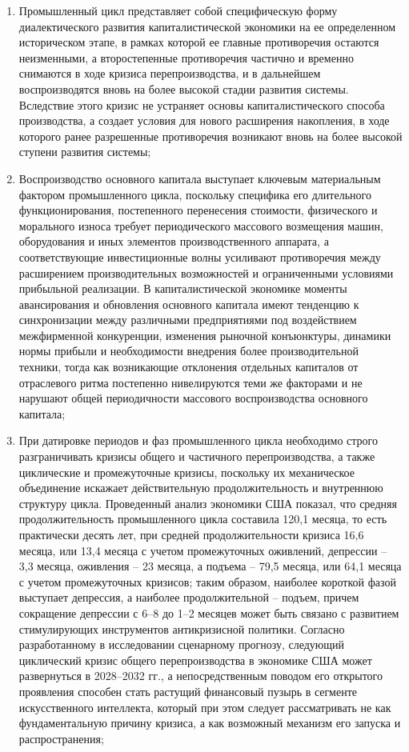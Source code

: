 \begin{enumerate}
    \item Промышленный цикл представляет собой специфическую форму диалектического развития капиталистической экономики на ее определенном историческом этапе, в рамках которой ее главные противоречия остаются неизменными, а второстепенные противоречия частично и временно снимаются в ходе кризиса перепроизводства, и в дальнейшем воспроизводятся вновь на более высокой стадии развития системы. Вследствие этого кризис не устраняет основы капиталистического способа производства, а создает условия для нового расширения накопления, в ходе которого ранее разрешенные противоречия возникают вновь на более высокой ступени развития системы;
    \item Воспроизводство основного капитала выступает ключевым материальным фактором промышленного цикла, поскольку специфика его длительного функционирования, постепенного перенесения стоимости, физического и морального износа требует периодического массового возмещения машин, оборудования и иных элементов производственного аппарата, а соответствующие инвестиционные волны усиливают противоречия между расширением производительных возможностей и ограниченными условиями прибыльной реализации. В капиталистической экономике моменты авансирования и обновления основного капитала имеют тенденцию к синхронизации между различными предприятиями под воздействием межфирменной конкуренции, изменения рыночной конъюнктуры, динамики нормы прибыли и необходимости внедрения более производительной техники, тогда как возникающие отклонения отдельных капиталов от отраслевого ритма постепенно нивелируются теми же факторами и не нарушают общей периодичности массового воспроизводства основного капитала;
    \item При датировке периодов и фаз промышленного цикла необходимо строго разграничивать кризисы общего и частичного перепроизводства, а также циклические и промежуточные кризисы, поскольку их механическое объединение искажает действительную продолжительность и внутреннюю структуру цикла. Проведенный анализ экономики США показал, что средняя продолжительность промышленного цикла составила 120,1 месяца, то есть практически десять лет, при средней продолжительности кризиса 16,6 месяца, или 13,4 месяца с учетом промежуточных оживлений, депрессии – 3,3 месяца, оживления – 23 месяца, а подъема – 79,5 месяца, или 64,1 месяца с учетом промежуточных кризисов; таким образом, наиболее короткой фазой выступает депрессия, а наиболее продолжительной – подъем, причем сокращение депрессии с 6–8 до 1–2 месяцев может быть связано с развитием стимулирующих инструментов антикризисной политики. Согласно разработанному в исследовании сценарному прогнозу, следующий циклический кризис общего перепроизводства в экономике США может развернуться в 2028–2032 гг., а непосредственным поводом его открытого проявления способен стать растущий финансовый пузырь в сегменте искусственного интеллекта, который при этом следует рассматривать не как фундаментальную причину кризиса, а как возможный механизм его запуска и распространения;

\end{enumerate}
